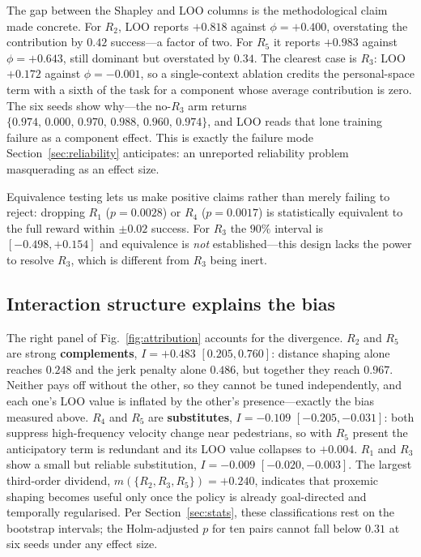 \documentclass[conference]{IEEEtran}
\begin{document}
The gap between the Shapley and LOO columns is the methodological claim made
concrete. For $R_2$, LOO reports $+0.818$ against $\phi=+0.400$, overstating the
contribution by $0.42$ success---a factor of two. For $R_5$ it reports $+0.983$
against $\phi=+0.643$, still dominant but overstated by $0.34$. The clearest case
is $R_3$: LOO $+0.172$ against $\phi=-0.001$, so a single-context ablation credits
the personal-space term with a sixth of the task for a component whose average
contribution is zero. The six seeds show why---the no-$R_3$ arm returns
$\{0.974,\,0.000,\,0.970,\,0.988,\,0.960,\,0.974\}$, and LOO reads that lone
training failure as a component effect. This is exactly the failure mode
Section~\ref{sec:reliability} anticipates: an unreported reliability problem
masquerading as an effect size.

Equivalence testing lets us make positive claims rather than merely failing to
reject: dropping $R_1$ ($p=0.0028$) or $R_4$ ($p=0.0017$) is statistically
equivalent to the full reward within $\pm0.02$ success. For $R_3$ the $90\%$
interval is $[-0.498,+0.154]$ and equivalence is \emph{not} established---this
design lacks the power to resolve $R_3$, which is different from $R_3$ being
inert.

\subsection{Interaction structure explains the bias}
The right panel of Fig.~\ref{fig:attribution} accounts for the divergence. $R_2$
and $R_5$ are strong \textbf{complements}, $I=+0.483$ $[0.205,0.760]$: distance
shaping alone reaches $0.248$ and the jerk penalty alone $0.486$, but together
they reach $0.967$. Neither pays off without the other, so they cannot be tuned
independently, and each one's LOO value is inflated by the other's
presence---exactly the bias measured above. $R_4$ and $R_5$ are
\textbf{substitutes}, $I=-0.109$ $[-0.205,-0.031]$: both suppress high-frequency
velocity change near pedestrians, so with $R_5$ present the anticipatory term is
redundant and its LOO value collapses to $+0.004$. $R_1$ and $R_3$ show a small
but reliable substitution, $I=-0.009$ $[-0.020,-0.003]$. The largest third-order
dividend, $m(\{R_2,R_3,R_5\})=+0.240$, indicates that proxemic shaping becomes
useful only once the policy is already goal-directed and temporally regularised.
Per Section~\ref{sec:stats}, these classifications rest on the bootstrap
intervals; the Holm-adjusted $p$ for ten pairs cannot fall below $0.31$ at six
seeds under any effect size.
\end{document}
